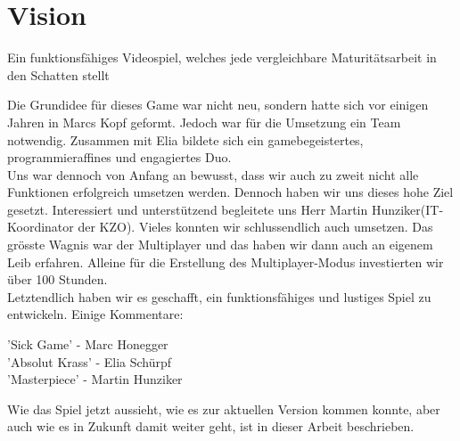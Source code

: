 \chapter{Vision}
\begin{center}
Ein funktionsfähiges Videospiel, welches jede vergleichbare Maturitätsarbeit in den Schatten stellt\\
\end{center}
Die Grundidee für dieses Game war nicht neu, sondern hatte sich vor einigen Jahren in Marcs Kopf geformt.
Jedoch war für die Umsetzung ein Team notwendig. Zusammen mit Elia bildete sich ein gamebegeistertes, programmieraffines und engagiertes Duo.\\
Uns war dennoch von Anfang an bewusst,
dass wir auch zu zweit nicht alle Funktionen erfolgreich umsetzen werden. Dennoch haben wir uns dieses hohe Ziel gesetzt. Interessiert und 
unterstützend begleitete uns Herr Martin Hunziker(IT-Koordinator der KZO).
Vieles konnten wir schlussendlich auch umsetzen.
Das grösste Wagnis war der Multiplayer und das haben wir dann auch an eigenem Leib erfahren.
Alleine für die Erstellung des Multiplayer-Modus investierten wir über 100 Stunden.\\
Letztendlich haben wir es geschafft, ein funktionsfähiges und lustiges Spiel zu entwickeln.
Einige Kommentare:
\begin{center}
    'Sick Game' - Marc Honegger \\
    'Absolut Krass' - Elia Schürpf \\ 
    'Masterpiece' - Martin Hunziker
\end{center}
Wie das Spiel jetzt aussieht, wie es zur aktuellen Version kommen konnte, aber auch wie es in Zukunft damit weiter geht, ist in dieser Arbeit beschrieben.